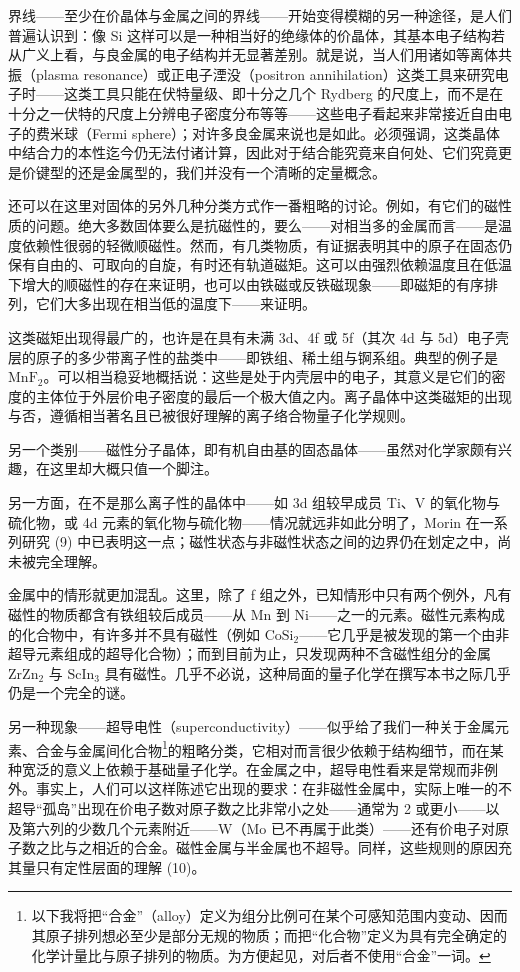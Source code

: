 界线——至少在价晶体与金属之间的界线——开始变得模糊的另一种途径，是人们普遍认识到：像 Si 这样可以是一种相当好的绝缘体的价晶体，其基本电子结构若从广义上看，与良金属的电子结构并无显著差别。就是说，当人们用诸如等离体共振（plasma resonance）或正电子湮没（positron annihilation）这类工具来研究电子时——这类工具只能在伏特量级、即十分之几个 Rydberg 的尺度上，而不是在十分之一伏特的尺度上分辨电子密度分布等等——这些电子看起来非常接近自由电子的费米球（Fermi sphere）；对许多良金属来说也是如此。必须强调，这类晶体中结合力的本性迄今仍无法付诸计算，因此对于结合能究竟来自何处、它们究竟更是价键型的还是金属型的，我们并没有一个清晰的定量概念。

还可以在这里对固体的另外几种分类方式作一番粗略的讨论。例如，有它们的磁性质的问题。绝大多数固体要么是抗磁性的，要么——对相当多的金属而言——是温度依赖性很弱的轻微顺磁性。然而，有几类物质，有证据表明其中的原子在固态仍保有自由的、可取向的自旋，有时还有轨道磁矩。这可以由强烈依赖温度且在低温下增大的顺磁性的存在来证明，也可以由铁磁或反铁磁现象——即磁矩的有序排列，它们大多出现在相当低的温度下——来证明。

这类磁矩出现得最广的，也许是在具有未满 3d、4f 或 5f（其次 4d 与 5d）电子壳层的原子的多少带离子性的盐类中——即铁组、稀土组与锕系组。典型的例子是 $\mathrm{MnF}_2$。可以相当稳妥地概括说：这些是处于内壳层中的电子，其意义是它们的密度的主体位于外层价电子密度的最后一个极大值之内。离子晶体中这类磁矩的出现与否，遵循相当著名且已被很好理解的离子络合物量子化学规则。

另一个类别——磁性分子晶体，即有机自由基的固态晶体——虽然对化学家颇有兴趣，在这里却大概只值一个脚注。

另一方面，在不是那么离子性的晶体中——如 3d 组较早成员 Ti、V 的氧化物与硫化物，或 4d 元素的氧化物与硫化物——情况就远非如此分明了，Morin 在一系列研究 (9) 中已表明这一点；磁性状态与非磁性状态之间的边界仍在划定之中，尚未被完全理解。

金属中的情形就更加混乱。这里，除了 f 组之外，已知情形中只有两个例外，凡有磁性的物质都含有铁组较后成员——从 Mn 到 Ni——之一的元素。磁性元素构成的化合物中，有许多并不具有磁性（例如 $\mathrm{CoSi}_2$——它几乎是被发现的第一个由非超导元素组成的超导化合物）；而到目前为止，只发现两种不含磁性组分的金属 $\mathrm{ZrZn}_2$ 与 $\mathrm{ScIn}_3$ 具有磁性。几乎不必说，这种局面的量子化学在撰写本书之际几乎仍是一个完全的谜。

另一种现象——超导电性（superconductivity）——似乎给了我们一种关于金属元素、合金与金属间化合物\footnote{以下我将把“合金”（alloy）定义为组分比例可在某个可感知范围内变动、因而其原子排列想必至少是部分无规的物质；而把“化合物”定义为具有完全确定的化学计量比与原子排列的物质。为方便起见，对后者不使用“合金”一词。}的粗略分类，它相对而言很少依赖于结构细节，而在某种宽泛的意义上依赖于基础量子化学。在金属之中，超导电性看来是常规而非例外。事实上，人们可以这样陈述它出现的要求：在非磁性金属中，实际上唯一的不超导“孤岛”出现在价电子数对原子数之比非常小之处——通常为 2 或更小——以及第六列的少数几个元素附近——W（Mo 已不再属于此类）——还有价电子对原子数之比与之相近的合金。磁性金属与半金属也不超导。同样，这些规则的原因充其量只有定性层面的理解 (10)。
